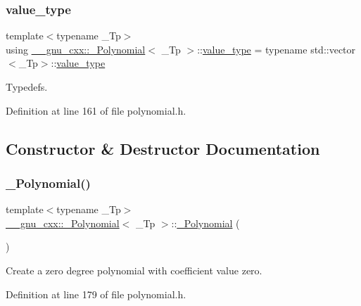 \subsubsection{\texorpdfstring{value\+\_\+type}{value\_type}}
{\footnotesize\ttfamily template$<$typename \+\_\+\+Tp$>$ \\
using \hyperlink{class____gnu__cxx_1_1__Polynomial}{\+\_\+\+\_\+gnu\+\_\+cxx\+::\+\_\+\+Polynomial}$<$ \+\_\+\+Tp $>$\+::\hyperlink{class____gnu__cxx_1_1__Polynomial_a725563351f50e76084a7a016c06f8a53}{value\+\_\+type} =  typename std\+::vector$<$\+\_\+\+Tp$>$\+::\hyperlink{class____gnu__cxx_1_1__Polynomial_a725563351f50e76084a7a016c06f8a53}{value\+\_\+type}}

Typedefs. 

Definition at line 161 of file polynomial.\+h.



\subsection{Constructor \& Destructor Documentation}
\mbox{\label{class____gnu__cxx_1_1__Polynomial_ad2baf4c12b7e3ab131a592afa3f391ae}} 
\subsubsection{\texorpdfstring{\+\_\+\+Polynomial()}{\_Polynomial()}\hspace{0.1cm}{\footnotesize\ttfamily [1/9]}}
{\footnotesize\ttfamily template$<$typename \+\_\+\+Tp$>$ \\
\hyperlink{class____gnu__cxx_1_1__Polynomial}{\+\_\+\+\_\+gnu\+\_\+cxx\+::\+\_\+\+Polynomial}$<$ \+\_\+\+Tp $>$\+::\hyperlink{class____gnu__cxx_1_1__Polynomial}{\+\_\+\+Polynomial} (\begin{DoxyParamCaption}{ }\end{DoxyParamCaption})\hspace{0.3cm}{\ttfamily [inline]}}

Create a zero degree polynomial with coefficient value zero. 

Definition at line 179 of file polynomial.\+h.


